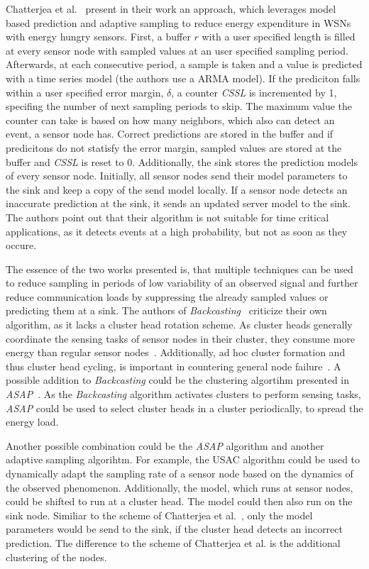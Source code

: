 Chatterjea et al.~\cite{chatterjea2008adaptive} present in their work an
approach, which leverages model based prediction and adaptive sampling to
reduce energy expenditure in \acp{WSN} with energy hungry sensors. First, a
buffer $ r $ with a user specified length is filled at every sensor node with
sampled values at an user specified sampling period. Afterwards, at each
consecutive period, a sample is taken and a value is predicted with a time
series model (the authors use a \ac{ARMA} model). If the prediciton falls
within a user specified error margin, $ \delta $, a counter \textit{CSSL} is
incremented by 1, specifing the number of next sampling periods to skip. The
maximum value the counter can take is based on how many neighbors, which also
can detect an event, a sensor node has. Correct predictions are stored in the
buffer and if predicitons do not statisfy the error margin, sampled values are
stored at the buffer and \textit{CSSL} is reset to 0. Additionally, the sink
stores the prediction models of every sensor node. Initially, all sensor nodes
send their model parameters to the sink and keep a copy of the send model
locally. If a sensor node detects an inaccurate prediction at the sink, it
sends an updated server model to the sink. The authors point out that their
algorithm is not suitable for time critical applications, as it detects events
at a high probability, but not as soon as they occure.

The essence of the two works presented is, that multiple techniques can be used
to reduce sampling in periods of low variability of an observed signal and
further reduce communication loads by suppressing the already sampled values or
predicting them at a sink. The authors of
\textit{Backcasting}~\cite{willett2004backcasting} criticize their own
algorithm, as it lacks a cluster head rotation scheme. As cluster heads
generally coordinate the sensing tasks of sensor nodes in their cluster, they
consume more energy than regular sensor nodes~\cite{pradhan2016cluster}.
Additionally, ad hoc cluster formation and thus cluster head cycling, is
important in countering general node failure~\cite{hu2018fault}. A possible
addition to \textit{Backcasting} could be the clustering algortihm presented in
\textit{ASAP}~\cite{gedik2007asap}. As the \textit{Backcasting} algorithm
activates clusters to perform sensing tasks, \textit{ASAP} could be used to
select cluster heads in a cluster periodically, to spread the energy load.

Another possible combination could be the \textit{ASAP} algorithm and another
adaptive sampling algorihtm. For example, the \ac{USAC} algorithm could be used
to dynamically adapt the sampling rate of a sensor node based on the dynamics
of the observed phenomenon. Additionally, the model, which runs at sensor
nodes, could be shifted to run at a cluster head. The model could then also run
on the sink node. Similiar to the scheme of Chatterjea et
al.~\cite{chatterjea2008adaptive}, only the model parameters would be send to
the sink, if the cluster head detects an incorrect prediction. The difference
to the scheme of Chatterjea et al. is the additional clustering of the nodes. 

